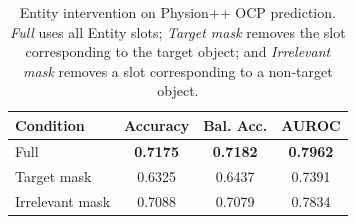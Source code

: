 \begin{table}[t]
\centering
\caption{
Entity intervention on Physion++ OCP prediction.
\textit{Full} uses all Entity slots;
\textit{Target mask} removes the slot corresponding to the target object;
and \textit{Irrelevant mask} removes a slot corresponding to a non-target object.
}
\label{tab:input-object-intervention}
\small
\renewcommand{\arraystretch}{1.03}

\begin{tabularx}{0.70\linewidth}{@{}Lccc@{}}
\toprule
\textbf{Condition} & \textbf{Accuracy} & \textbf{Bal. Acc.} & \textbf{AUROC} \\
\midrule
Full            & \textbf{0.7175} & \textbf{0.7182} & \textbf{0.7962} \\
Target mask     & 0.6325          & 0.6437          & 0.7391          \\
Irrelevant mask & 0.7088          & 0.7079          & 0.7834          \\
\bottomrule
\end{tabularx}
\end{table}
